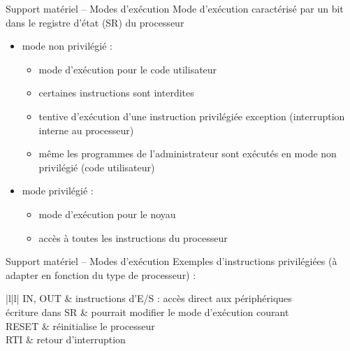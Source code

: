 \begin {frame} {Support matériel -- Modes d'exécution}
    Mode d'exécution caractérisé par un bit dans le registre d'état (SR)
    du processeur
    \begin {itemize}
	\item mode non privilégié :
	    \begin {itemize}
		\item mode d'exécution pour le code utilisateur
		\item certaines instructions sont interdites
		\item tentive d'exécution d'une instruction privilégiée
		    \implique
		    exception (interruption interne au processeur)
		\item même les programmes de l'administrateur sont
		    exécutés en mode non privilégié (code utilisateur)
	    \end {itemize}
	\item mode privilégié :
	    \begin {itemize}
		\item mode d'exécution pour le noyau
		\item accès à toutes les instructions du processeur
	    \end {itemize}
    \end {itemize}
\end {frame}

\begin {frame} {Support matériel -- Modes d'exécution}
    Exemples d'instructions privilégiées (à adapter en fonction du
    type de processeur) :

    \ctableau {\fC} {|l|l|} {
	\rca IN, OUT & instructions d'E/S : accès direct aux périphériques \\
	\rcb écriture dans SR & pourrait modifier le mode d'exécution courant \\
	\rca RESET & réinitialise le processeur \\
	\rcb RTI & retour d'interruption \\
    }
\end {frame}




